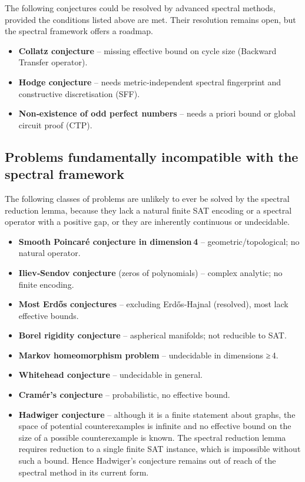 \documentclass[11pt,a4paper]{article}
\begin{document}
The following conjectures could be resolved by advanced spectral methods, provided the conditions listed above are met. Their resolution remains open, but the spectral framework offers a roadmap.

\begin{itemize}
\item \textbf{Collatz conjecture} – missing effective bound on cycle size (Backward Transfer operator).
\item \textbf{Hodge conjecture} – needs metric‑independent spectral fingerprint and constructive discretisation (SFF).
\item \textbf{Non‑existence of odd perfect numbers} – needs a priori bound or global circuit proof (CTP).
\end{itemize}

\subsection{Problems fundamentally incompatible with the spectral framework}

The following classes of problems are unlikely to ever be solved by the spectral reduction lemma, because they lack a natural finite SAT encoding or a spectral operator with a positive gap, or they are inherently continuous or undecidable.

\begin{itemize}
\item \textbf{Smooth Poincaré conjecture in dimension 4} – geometric/topological; no natural operator.
\item \textbf{Iliev‑Sendov conjecture} (zeros of polynomials) – complex analytic; no finite encoding.
\item \textbf{Most Erdős conjectures} – excluding Erdős‑Hajnal (resolved), most lack effective bounds.
\item \textbf{Borel rigidity conjecture} – aspherical manifolds; not reducible to SAT.
\item \textbf{Markov homeomorphism problem} – undecidable in dimensions ≥ 4.
\item \textbf{Whitehead conjecture} – undecidable in general.
\item \textbf{Cramér’s conjecture} – probabilistic, no effective bound.
\item \textbf{Hadwiger conjecture} – although it is a finite statement about graphs, the space of potential counterexamples is infinite and no effective bound on the size of a possible counterexample is known. The spectral reduction lemma requires reduction to a single finite SAT instance, which is impossible without such a bound. Hence Hadwiger’s conjecture remains out of reach of the spectral method in its current form.
\end{itemize}
\end{document}
